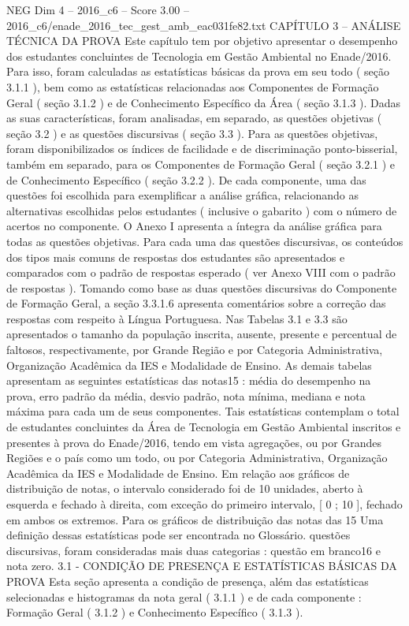 \begin{textsample}{NEG Dim 4 – 2016\_c6 – Score 3.00 – 2016\_c6/enade\_2016\_tec\_gest\_amb\_eac031fe82.txt}  \label{ex:f4_neg_305}
CAPÍTULO 3 – ANÁLISE TÉCNICA DA PROVA Este capítulo tem por objetivo apresentar o desempenho dos estudantes concluintes de Tecnologia em Gestão Ambiental no Enade/2016.
Para isso, foram calculadas as estatísticas básicas da prova em seu todo ( seção 3.1.1 ), bem como as estatísticas relacionadas aos Componentes de Formação Geral ( seção 3.1.2 ) e de Conhecimento Específico da Área ( seção 3.1.3 ).
Dadas as suas características, foram analisadas, em separado, as questões objetivas ( seção 3.2 ) e as questões discursivas ( seção 3.3 ).
Para as questões objetivas, foram disponibilizados os índices de facilidade e de discriminação ponto-bisserial, também em separado, para os Componentes de Formação Geral ( seção 3.2.1 ) e de Conhecimento Específico ( seção 3.2.2 ).
De cada componente, uma das questões foi escolhida para exemplificar a análise gráfica, relacionando as alternativas escolhidas pelos estudantes ( inclusive o gabarito ) com o número de acertos no componente.
O Anexo I apresenta a íntegra da análise gráfica para todas as questões objetivas.
Para cada uma das questões discursivas, os conteúdos dos tipos mais comuns de respostas dos estudantes são apresentados e comparados com o padrão de respostas esperado ( ver Anexo VIII com o padrão de respostas ).
Tomando como base as duas questões discursivas do Componente de Formação Geral, a seção 3.3.1.6 apresenta comentários sobre a correção das respostas com respeito à Língua Portuguesa.
Nas Tabelas 3.1 e 3.3 são apresentados o tamanho da população inscrita, ausente, presente e percentual de faltosos, respectivamente, por Grande Região e por Categoria Administrativa, Organização Acadêmica da IES e Modalidade de Ensino.
As demais tabelas apresentam as seguintes estatísticas das notas15 : média do desempenho na prova, erro padrão da média, desvio padrão, nota mínima, mediana e nota máxima para cada um de seus componentes.
Tais estatísticas contemplam o total de estudantes concluintes da Área de Tecnologia em Gestão Ambiental inscritos e presentes à prova do Enade/2016, tendo em vista agregações, ou por Grandes Regiões e o país como um todo, ou por Categoria Administrativa, Organização Acadêmica da IES e Modalidade de Ensino.
Em relação aos gráficos de distribuição de notas, o intervalo considerado foi de 10 unidades, aberto à esquerda e fechado à direita, com exceção do primeiro intervalo, [ 0 ; 10 ], fechado em ambos os extremos.
Para os gráficos de distribuição das notas das 15 Uma definição dessas estatísticas pode ser encontrada no Glossário. questões discursivas, foram consideradas mais duas categorias : questão em branco16 e nota zero. 3.1 - CONDIÇÃO DE PRESENÇA E ESTATÍSTICAS BÁSICAS DA PROVA Esta seção apresenta a condição de presença, além das estatísticas selecionadas e histogramas da nota geral ( 3.1.1 ) e de cada componente : Formação Geral ( 3.1.2 ) e Conhecimento Específico ( 3.1.3 ).

\end{textsample}
